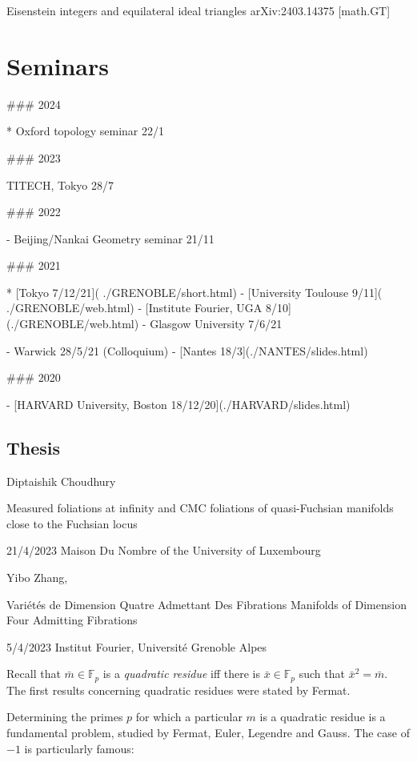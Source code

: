 \documentclass[12pt,a4paper]{amsart}
\def\fp{\mathbb{F}_p}
\begin{document}
Eisenstein integers and equilateral ideal triangles
	arXiv:2403.14375 [math.GT]


\section{Seminars}

### 2024

* Oxford topology seminar 22/1

### 2023

TITECH, Tokyo  28/7

### 2022

- Beijing/Nankai Geometry seminar 21/11

### 2021

* [Tokyo 7/12/21]( ./GRENOBLE/short.html)
- [University Toulouse 9/11]( ./GRENOBLE/web.html)
- [Institute Fourier, UGA 8/10](./GRENOBLE/web.html)
- Glasgow University 7/6/21



- Warwick 28/5/21 (Colloquium)
- [Nantes 18/3](./NANTES/slides.html)

### 2020

- [HARVARD University, Boston 18/12/20](./HARVARD/slides.html)




\subsection{Thesis}

Diptaishik Choudhury

Measured foliations at infinity and CMC foliations of quasi-Fuchsian manifolds
close to the Fuchsian locus


21/4/2023 Maison Du Nombre of the University of Luxembourg

Yibo Zhang,

Variétés de Dimension Quatre Admettant Des Fibrations
Manifolds of Dimension Four Admitting Fibrations

5/4/2023 Institut Fourier, Université Grenoble Alpes





Recall
that $\bar{m}\in \fp$ is a \textit{quadratic residue} iff
there is $\bar{x}\in \fp $ such that $\bar{x}^2 = \bar{m}$.
The first results concerning quadratic residues were stated by
Fermat. 

Determining the primes $p$ for which a particular $m$ is a quadratic
residue is a fundamental problem, studied by Fermat, Euler, Legendre
and Gauss. The case of $-1$ is particularly famous:
\end{document}
